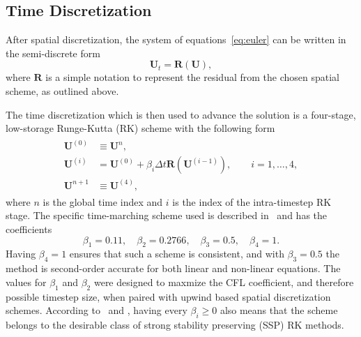 \subsection{Time Discretization}
\label{subsec:time}

After spatial discretization, the system of equations~\eqref{eq:euler} can be written in the semi-discrete form
\begin{equation}
\mathbf{U}_t=\mathbf{R}(\mathbf{U}),
\end{equation}
where $\mathbf{R}$ is a simple notation to represent the residual from the chosen spatial scheme, as outlined above.

The time discretization which is then used to advance the solution is a four-stage, low-storage Runge-Kutta (RK) scheme with the following form
\begin{align}
\begin{split}
\mathbf{U}^{(0)} &\equiv \mathbf{U}^n,\\
\mathbf{U}^{(i)} &= \mathbf{U}^{(0)} + \beta_i \Delta t \mathbf{R} \left(\mathbf{U}^{(i-1)}\right),\qquad i=1,\ldots ,4,\\
\mathbf{U}^{n+1} &\equiv \mathbf{U}^{(4)},
\end{split}
\end{align}
where $n$ is the global time index and $i$ is the index of the intra-timestep RK stage. The specific time-marching scheme used is described in~\cite{Lallemand1990} and has the coefficients
\begin{equation}
\beta_1=0.11,\quad \beta_2=0.2766,\quad \beta_3=0.5,\quad \beta_4=1.
\end{equation}
Having $\beta_4=1$ ensures that such a scheme is consistent, and with $\beta_3=0.5$ the method is second-order accurate for both linear and non-linear equations. The values for $\beta_1$ and $\beta_2$ were designed to maxmize the CFL coefficient, and therefore possible timestep size, when paired with upwind based spatial discretization schemes. According to~\cite{Shu1988} and \cite{Macdonald2003}, having every $\beta_i \geq 0$ also means that the scheme belongs to the desirable class of strong stability preserving (SSP) RK methods.
